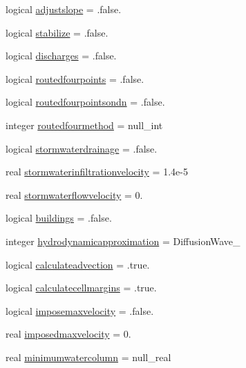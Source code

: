 \begin{DoxyCompactItemize}
\item 
logical \mbox{\hyperlink{structmodulerunoff_1_1t__runoff_aa5fb157b4c037191ea92aa22bd9319a7}{adjustslope}} = .false.
\item 
logical \mbox{\hyperlink{structmodulerunoff_1_1t__runoff_a6c3c2fc943f2006235a6c22b766a22f6}{stabilize}} = .false.
\item 
logical \mbox{\hyperlink{structmodulerunoff_1_1t__runoff_abee892237036a74f30d776a2d50ba0dd}{discharges}} = .false.
\item 
logical \mbox{\hyperlink{structmodulerunoff_1_1t__runoff_a9a51871757a0eec25a67a9deb4f203c6}{routedfourpoints}} = .false.
\item 
logical \mbox{\hyperlink{structmodulerunoff_1_1t__runoff_a0744ce3bf9d1369b918f7d0ee436be22}{routedfourpointsondn}} = .false.
\item 
integer \mbox{\hyperlink{structmodulerunoff_1_1t__runoff_a53b93f883fbbf2b0041b232c2ac32d14}{routedfourmethod}} = null\+\_\+int
\item 
logical \mbox{\hyperlink{structmodulerunoff_1_1t__runoff_a8ceaa1fea9a28647ea841b30aacea137}{stormwaterdrainage}} = .false.
\item 
real \mbox{\hyperlink{structmodulerunoff_1_1t__runoff_a4c53a2af35011f65b32a4af0ef7d7e67}{stormwaterinfiltrationvelocity}} = 1.\+4e-\/5
\item 
real \mbox{\hyperlink{structmodulerunoff_1_1t__runoff_a4d8f8d7126c3fce6a7a4efbd3c0c6028}{stormwaterflowvelocity}} = 0.
\item 
logical \mbox{\hyperlink{structmodulerunoff_1_1t__runoff_ad68d356719565c9ac7281165abcb75ba}{buildings}} = .false.
\item 
integer \mbox{\hyperlink{structmodulerunoff_1_1t__runoff_a9167bd69d445637b14033387d86a3425}{hydrodynamicapproximation}} = Diffusion\+Wave\+\_\+
\item 
logical \mbox{\hyperlink{structmodulerunoff_1_1t__runoff_a47f639dfad19d52ada4c7214f69ac4a5}{calculateadvection}} = .true.
\item 
logical \mbox{\hyperlink{structmodulerunoff_1_1t__runoff_a123cf52eea84402ee6bc30177831a7e0}{calculatecellmargins}} = .true.
\item 
logical \mbox{\hyperlink{structmodulerunoff_1_1t__runoff_aa247fd3baaf87035a3337013acd170bc}{imposemaxvelocity}} = .false.
\item 
real \mbox{\hyperlink{structmodulerunoff_1_1t__runoff_a2e5e98f396e644ac8f5f9eb0da4c001f}{imposedmaxvelocity}} = 0.
\item 
real \mbox{\hyperlink{structmodulerunoff_1_1t__runoff_afd456806321d19108345e050cbe4a717}{minimumwatercolumn}} = null\+\_\+real

\end{DoxyCompactItemize}
